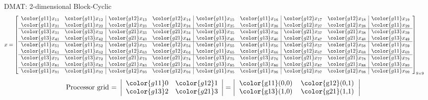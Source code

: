 \begin{frame}[shrink]
\begin{exampleblock}{DMAT: 2-dimensional Block-Cyclic}
\begin{align*}
x &= \left[
      \begin{array}{ll|ll|ll|ll|l}
      \color{g11}x_{11} & \color{g11}x_{12} & \color{g12}x_{13} & \color{g12}x_{14} & \color{g11}x_{15} & \color{g11}x_{16} & \color{g12}x_{17} & \color{g12}x_{18} & \color{g11}x_{19}\\
      \color{g11}x_{21} & \color{g11}x_{22} & \color{g12}x_{23} & \color{g12}x_{24} & \color{g11}x_{25} & \color{g11}x_{26} & \color{g12}x_{27} & \color{g12}x_{28} & \color{g11}x_{29}\\\hline
      \color{g13}x_{31} & \color{g13}x_{32} & \color{g21}x_{33} & \color{g21}x_{34} & \color{g13}x_{35} & \color{g13}x_{36} & \color{g21}x_{37} & \color{g21}x_{38} & \color{g13}x_{39}\\
      \color{g13}x_{41} & \color{g13}x_{42} & \color{g21}x_{43} & \color{g21}x_{44} & \color{g13}x_{45} & \color{g13}x_{46} & \color{g21}x_{47} & \color{g21}x_{48} & \color{g13}x_{49}\\\hline
      \color{g11}x_{51} & \color{g11}x_{52} & \color{g12}x_{53} & \color{g12}x_{54} & \color{g11}x_{55} & \color{g11}x_{56} & \color{g12}x_{57} & \color{g12}x_{58} & \color{g11}x_{59}\\
      \color{g11}x_{61} & \color{g11}x_{62} & \color{g12}x_{63} & \color{g12}x_{64} & \color{g11}x_{65} & \color{g11}x_{66} & \color{g12}x_{67} & \color{g12}x_{68} & \color{g11}x_{69}\\\hline
      \color{g13}x_{71} & \color{g13}x_{72} & \color{g21}x_{73} & \color{g21}x_{74} & \color{g13}x_{75} & \color{g13}x_{76} & \color{g21}x_{77} & \color{g21}x_{78} & \color{g13}x_{79}\\
      \color{g13}x_{81} & \color{g13}x_{82} & \color{g21}x_{83} & \color{g21}x_{84} & \color{g13}x_{85} & \color{g13}x_{86} & \color{g21}x_{87} & \color{g21}x_{88} & \color{g13}x_{89}\\\hline
      \color{g11}x_{91} & \color{g11}x_{92} & \color{g12}x_{93} & \color{g12}x_{94} & \color{g11}x_{95} & \color{g11}x_{96} & \color{g12}x_{97} & \color{g12}x_{98} & \color{g11}x_{99}\\
      \end{array}
\right]_{9\times 9}
\end{align*}
\begin{align*}
\text{Processor grid = }\left|
      \begin{array}{ll}
      \color{g11}0 & \color{g12}1 \\
      \color{g13}2 & \color{g21}3
      \end{array}
\right| &= 
\left|
      \begin{tabular}{lll}
      \color{g11}(0,0) & \color{g12}(0,1) \\
      \color{g13}(1,0) & \color{g21}(1,1) 
      \end{tabular}
\right|
\end{align*}
\end{exampleblock}
\end{frame}
